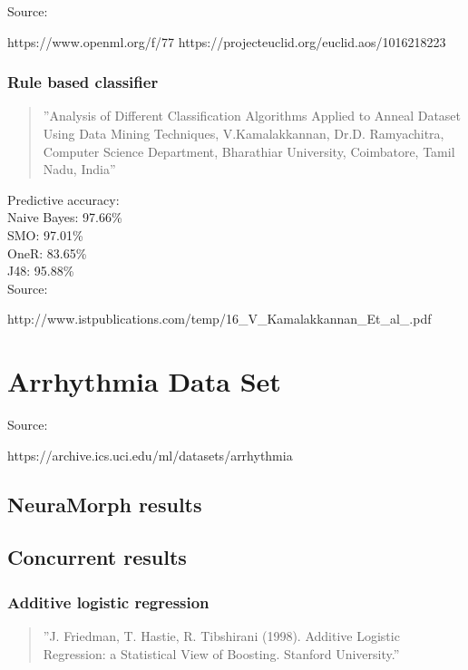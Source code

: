 \documentclass[8pt, a4paper]{article}
\begin{document}
Source:

https://www.openml.org/f/77
https://projecteuclid.org/euclid.aos/1016218223

\subsubsection{Rule based classifier}

\begin{quote}
''Analysis of Different Classification Algorithms Applied to Anneal
Dataset Using Data Mining Techniques, V.Kamalakkannan, Dr.D. Ramyachitra, Computer Science Department, Bharathiar University, Coimbatore, Tamil Nadu, India''
\end{quote}

Predictive accuracy:\\
Naive Bayes: 97.66\%\\
SMO: 97.01\%\\
OneR: 83.65\%\\
J48: 95.88\%\\

Source:

http://www.istpublications.com/temp/16\_V\_Kamalakkannan\_Et\_al\_.pdf




\newpage
\section{Arrhythmia Data Set}

Source: 

https://archive.ics.uci.edu/ml/datasets/arrhythmia

\subsection{NeuraMorph results}



\subsection{Concurrent results}

\subsubsection{Additive logistic regression}

\begin{quote}
''J. Friedman, T. Hastie, R. Tibshirani (1998). Additive Logistic Regression: a Statistical View of Boosting. Stanford University.''
\end{quote}
\end{document}
